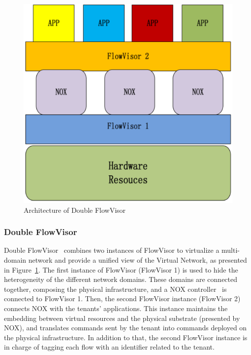 \begin{figure}[ht]
    \centering
    \includegraphics[scale=0.6]{figures/double_fv.pdf}
    \caption{Architecture of Double FlowVisor~\cite{DoubleFV-Yin2013}}
    \label{fig:double-fv}
\end{figure}

\subsubsection{Double FlowVisor}
Double FlowVisor~\cite{DoubleFV-Yin2013} combines two instances of FlowVisor to virtualize a multi-domain network and provide a unified view of the Virtual Network, as presented in Figure~\ref{fig:double-fv}. The first instance of FlowVisor (FlowVisor 1) is used to hide the heterogeneity of the different network domains. These domains are connected together, composing the physical infrastructure, and a NOX controller~\cite{nox-gude2008} is connected to FlowVisor 1.
Then, the second FlowVisor instance (FlowVisor 2) connects NOX with the tenants' applications. This instance maintains the embedding between virtual resources and the physical substrate (presented by NOX), and translates commands sent by the tenant into commands deployed on the physical infrastructure. In addition to that, the second FlowVisor instance is in charge of tagging each flow with an identifier related to the tenant.

